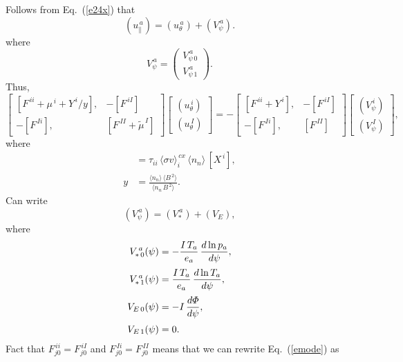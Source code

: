 \documentclass[12pt]{article}
\begin{document}
Follows from Eq.~(\ref{e24x}) that
\begin{equation}
 (u_{\parallel}^{\,a})  = (u_\theta^{\,a}) + (V_\psi^{\,a}).
\end{equation}
where
\begin{equation}
V_\psi^{\,a} = \left(\begin{array}{c}V_{\psi\,0}^{\,a}\\[1ex]
V_{\psi\,1}^{\,a}\end{array}\right).
\end{equation}
Thus, 
\begin{equation}\label{emode}
\left[\begin{array}{rr} [F^{\,ii}+\mu^{\,i}+Y^{\,i}/y], & -[F^{\,iI}]\\[0.5ex] -[F^{\,Ii}], & [F^{\,II}+\tilde{\mu}^{\,I}]\end{array}\right]
\left[\begin{array}{c}(u_\theta^{\,i}) \\[0.5ex] (u_\theta^{\,I})\end{array}\right]
= -\left[\begin{array}{rr} [F^{\,ii}+Y^{\,i}], & -[F^{\,iI}]\\[0.5ex] -[F^{\,Ii}], & [F^{\,II}]\end{array}\right]
\left[\begin{array}{c} (V_\psi^{\,i})\\[0.5ex]
(V_\psi^{\,I})\end{array}\right],
\end{equation}
where
\begin{align}
[Y^{\,i}] &= \tau_{ii}\,\langle\sigma v\rangle_i^{\,cx}\,\langle n_n\rangle \,[X^{\,i}],\\[0.5ex]
y &= \frac{\langle n_n\rangle\,\langle B^{\,2}\rangle}{\langle n_n\,B^{\,2}\rangle}.
\end{align}
Can write
\begin{equation}
(V_\psi^{\,a}) = (V_\ast^{\,a}) + (V_E),
\end{equation}
where
\begin{align}
V_{\ast\,0}^{\,a}(\psi) &=
- \frac{I\,T_a}{e_a}\,\frac{d \ln p_a}{d\psi},\\[0.5ex]
V_{\ast\,1}^{\,a}(\psi) &= \frac{I\,T_a}{e_a}\,\frac{d\ln T_a}{d\psi},\\[0.5ex]
V_{E\,0}(\psi) &=- I\,\frac{d{\mit\Phi}}{d\psi}
,\\[0.5ex]
V_{E\,1}(\psi) &= 0.
\end{align}
Fact that $F^{\,ii}_{j0} =F^{\,iI}_{j0}$ and $F^{\,Ii}_{j0}=F^{\,II}_{j0}$ means that we can rewrite Eq.~(\ref{emode}) as
\end{document}
